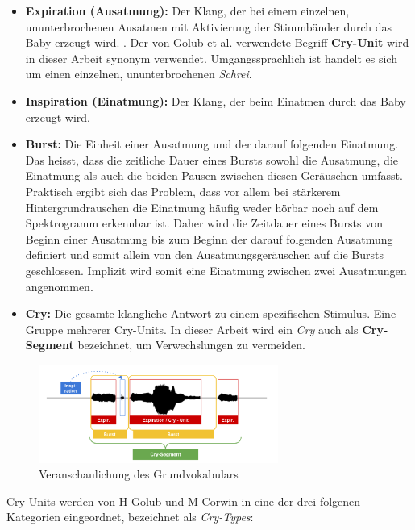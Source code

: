 \begin{itemize}
	 \item \textbf{Expiration (Ausatmung):} Der Klang, der bei einem einzelnen, ununterbrochenen Ausatmen mit Aktivierung der Stimmbänder durch das Baby erzeugt wird. \cite{rythmic}. Der von Golub et al. \cite[S. 61]{cryModel} verwendete Begriff \textbf{Cry-Unit} wird in dieser Arbeit synonym verwendet. Umgangssprachlich ist handelt es sich um einen einzelnen, ununterbrochenen \emph{Schrei}.
	\item \textbf{Inspiration (Einatmung):} Der Klang, der beim Einatmen durch das Baby erzeugt wird.
	\item  \textbf{Burst:} Die Einheit einer Ausatmung und der darauf folgenden Einatmung. Das heisst, dass die zeitliche Dauer eines Bursts sowohl die Ausatmung, die Einatmung als auch die beiden Pausen zwischen diesen Geräuschen umfasst. Praktisch ergibt sich das Problem, dass vor allem bei stärkerem Hintergrundrauschen die Einatmung häufig weder hörbar noch auf dem Spektrogramm erkennbar ist. Daher wird die Zeitdauer eines Bursts von Beginn einer Ausatmung bis zum Beginn der darauf folgenden Ausatmung definiert und somit allein von den Ausatmungsgeräuschen auf die Bursts geschlossen. Implizit wird somit eine Einatmung zwischen zwei Ausatmungen angenommen.
	\item  \textbf{Cry:} Die gesamte klangliche Antwort zu einem spezifischen Stimulus. Eine Gruppe mehrerer Cry-Units.\cite[S. 61]{cryModel} In dieser Arbeit wird ein \emph{Cry} auch als \textbf{Cry-Segment} bezeichnet, um Verwechslungen zu vermeiden.
\end{itemize}

\begin{figure}
	\centering
	\includegraphics[width=0.7\textwidth]{bilder/cryVoc02.png}
	\caption{Veranschaulichung des Grundvokabulars}
	\label{img:cryVocabulary}
\end{figure}

Cry-Units werden von H Golub und M Corwin in eine der drei folgenen Kategorien eingeordnet, bezeichnet als \emph{Cry-Types}: \cite[S. 61 - 62]{cryModel}

